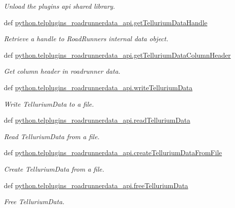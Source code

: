 \begin{DoxyCompactItemize}
\begin{DoxyCompactList}\small\item\em Unload the plugins api shared library. \end{DoxyCompactList}\item 
def \hyperlink{group__utilities_ga9691ae45dc959fc37c729693bc837f55}{python.\-telplugins\-\_\-roadrunnerdata\-\_\-api.\-get\-Tellurium\-Data\-Handle}
\begin{DoxyCompactList}\small\item\em Retrieve a handle to Road\-Runners internal data object. \end{DoxyCompactList}\item 
def \hyperlink{group__utilities_ga6e380d1b14b34a7b3939f8f3cd785649}{python.\-telplugins\-\_\-roadrunnerdata\-\_\-api.\-get\-Tellurium\-Data\-Column\-Header}
\begin{DoxyCompactList}\small\item\em Get column header in roadrunner data. \end{DoxyCompactList}\item 
def \hyperlink{group__utilities_ga71dfe014c4e7028d76823259db7d4d7b}{python.\-telplugins\-\_\-roadrunnerdata\-\_\-api.\-write\-Tellurium\-Data}
\begin{DoxyCompactList}\small\item\em Write Tellurium\-Data to a file. \end{DoxyCompactList}\item 
def \hyperlink{group__utilities_gac1753fd8c820b63e47084eb0906443f0}{python.\-telplugins\-\_\-roadrunnerdata\-\_\-api.\-read\-Tellurium\-Data}
\begin{DoxyCompactList}\small\item\em Read Tellurium\-Data from a file. \end{DoxyCompactList}\item 
def \hyperlink{group__utilities_ga6c3b892d56f2e63aecb0ec08fe0ba81f}{python.\-telplugins\-\_\-roadrunnerdata\-\_\-api.\-create\-Tellurium\-Data\-From\-File}
\begin{DoxyCompactList}\small\item\em Create Tellurium\-Data from a file. \end{DoxyCompactList}\item 
def \hyperlink{group__utilities_ga9a184e07948771edbd1b50abb172544a}{python.\-telplugins\-\_\-roadrunnerdata\-\_\-api.\-free\-Tellurium\-Data}
\begin{DoxyCompactList}\small\item\em Free Tellurium\-Data. \end{DoxyCompactList}\end{DoxyCompactItemize}


